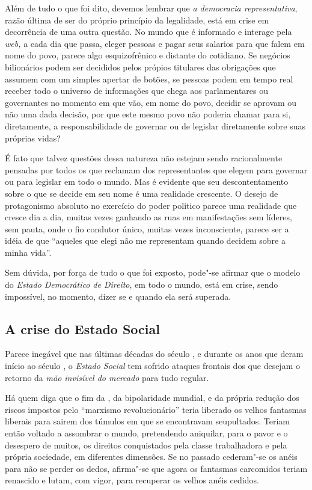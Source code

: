 Além de tudo o que foi dito, devemos lembrar que \emph{a democracia
representativa}, razão última de ser do próprio princípio da legalidade,
está em crise em decorrência de uma outra questão. No mundo que é
informado e interage pela \emph{web,} a cada dia que passa, eleger
pessoas e pagar seus salarios para que falem em nome do povo, parece
algo esquizofrênico e distante do cotidiano. Se negócios bilionários
podem ser decididos pelos própios titulares das obrigações que assumem
com um simples apertar de botões, se pessoas podem em tempo real receber
todo o universo de informações que chega aos parlamentares ou
governantes no momento em que vão, em nome do povo, decidir se aprovam
ou não uma dada decisão, por que este mesmo povo não poderia chamar para
si, diretamente, a responsabilidade de governar ou de legislar
diretamente sobre suas próprias vidas?

É fato que talvez questões dessa natureza não estejam sendo
racionalmente pensadas por todos os que reclamam dos representantes que
elegem para governar ou para legislar em todo o mundo. Mas é evidente
que seu descontentamento sobre o que se decide em seu nome é uma
realidade crescente. O desejo de protagonismo absoluto no exercício do
poder politico parece uma realidade que cresce dia a dia, muitas vezes
ganhando as ruas em manifestações sem líderes, sem pauta, onde o fio
condutor único, muitas vezes inconsciente, parece ser a idéia de que
``aqueles que elegi não me representam quando decidem sobre a
minha vida''.

Sem dúvida, por força de tudo o que foi exposto, pode"-se afirmar que o
modelo do \emph{Estado Democrático de Direito}, em todo o mundo, está em
crise, sendo impossível, no momento, dizer se e quando ela será
superada.

\subsection{A crise do Estado Social}

Parece inegável que nas últimas décadas do século , e durante os anos
que deram início ao século , o \emph{Estado Social} tem sofrido
ataques frontais dos que desejam o retorno da \emph{mão invisível do
mercado} para tudo regular.

Há quem diga que o fim da , da bipolaridade mundial, e da própria
redução dos riscos impostos pelo ``marxismo revolucionário'' teria
liberado os velhos fantasmas liberais para sairem dos túmulos em que se
encontravam seupultados. Teriam então voltado a assombrar o mundo,
pretendendo aniquilar, para o pavor e o desespero de muitos, os direitos
conquistados pela classe trabalhadora e pela própria sociedade, em
diferentes dimensões. Se no passado cederam"-se os anéis para não se
perder os dedos, afirma"-se que agora os fantasmas carcomidos teriam
renascido e lutam, com vigor, para recuperar os velhos anéis cedidos.

